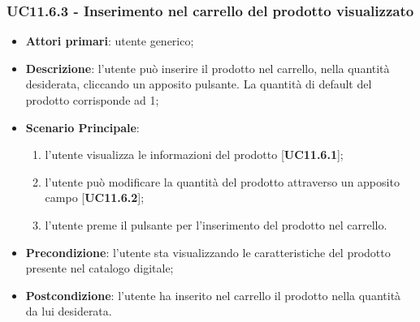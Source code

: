 \subsubsection{UC11.6.3 - Inserimento nel carrello del prodotto visualizzato}
\begin{itemize}
\item \textbf{Attori primari}: utente generico;
\item \textbf{Descrizione}: l'utente può inserire il prodotto nel carrello, nella quantità desiderata, cliccando un apposito pulsante. La quantità di default del prodotto corrisponde ad 1;
\item \textbf{Scenario Principale}:
\begin{enumerate}
\item l'utente visualizza le informazioni del prodotto [\textbf{UC11.6.1}];
\item l'utente può modificare la quantità del prodotto attraverso un apposito campo [\textbf{UC11.6.2}];
\item l'utente preme il pulsante per l'inserimento del prodotto nel carrello.
\end{enumerate}
\item \textbf{Precondizione}: l'utente sta visualizzando le caratteristiche del prodotto presente nel catalogo digitale;
\item \textbf{Postcondizione}: l'utente ha inserito nel carrello il prodotto nella quantità da lui desiderata.
\end{itemize}

